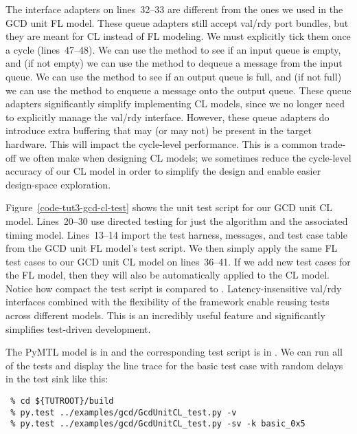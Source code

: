 \documentclass{cbxdoc}
\begin{document}
The interface adapters on lines~32--33 are different from the ones we
used in the GCD unit FL model. These queue adapters still accept val/rdy
port bundles, but they are meant for CL instead of FL modeling. We must
explicitly tick them once a cycle (lines~47--48). We can use the
 method to see if an input queue is empty, and (if not empty)
we can use the  method to dequeue a message from the input queue.
We can use the  method to see if an output queue is full, and
(if not full) we can use the  method to enqueue a message onto
the output queue. These queue adapters significantly simplify
implementing CL models, since we no longer need to explicitly manage the
val/rdy interface. However, these queue adapters do introduce extra
buffering that may (or may not) be present in the target hardware. This
will impact the cycle-level performance. This is a common trade-off we
often make when designing CL models; we sometimes reduce the cycle-level
accuracy of our CL model in order to simplify the design and enable
easier design-space exploration.



Figure~\ref{code-tut3-gcd-cl-test} shows the unit test script for our GCD
unit CL model. Lines~20--30 use directed testing for just the algorithm
and the associated timing model. Lines~13--14 import the test harness,
messages, and test case table from the GCD unit FL model's test script.
We then simply apply the same FL test cases to our GCD unit CL model on
lines~36--41. If we add new test cases for the FL model, then they will
also be automatically applied to the CL model. Notice how compact the
test script is compared to . Latency-insensitive
val/rdy interfaces combined with the flexibility of the 
framework enable reusing tests across different models. This is an
incredibly useful feature and significantly simplifies test-driven
development.

The PyMTL model is in  and the corresponding test script
is in . We can run all of the tests and display the
line trace for the basic test case with random delays in the test sink
like this:

\begin{verbatim}
 % cd ${TUTROOT}/build
 % py.test ../examples/gcd/GcdUnitCL_test.py -v
 % py.test ../examples/gcd/GcdUnitCL_test.py -sv -k basic_0x5
\end{verbatim}
\end{document}
